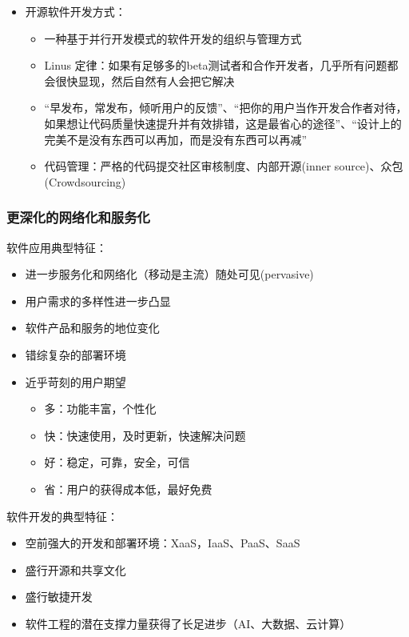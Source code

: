 \begin{itemize}
    \item 开源软件开发方式：
    \begin{itemize}
        \item 一种基于并行开发模式的软件开发的组织与管理方式
        \item Linus 定律：如果有足够多的beta测试者和合作开发者，几乎所有问题都会很快显现，然后自然有人会把它解决
        \item “早发布，常发布，倾听用户的反馈”、“把你的用户当作开发合作者对待，如果想让代码质量快速提升并有效排错，这是最省心的途径”、“设计上的完美不是没有东西可以再加，而是没有东西可以再减”
        \item 代码管理：严格的代码提交社区审核制度、内部开源(inner source)、众包(Crowdsourcing)
    \end{itemize}
\end{itemize}

\subsubsection{更深化的网络化和服务化}
软件应用典型特征：
\begin{itemize}
    \item 进一步服务化和网络化（移动是主流）随处可见(pervasive)
    \item 用户需求的多样性进一步凸显
    \item 软件产品和服务的地位变化
    \item 错综复杂的部署环境
    \item 近乎苛刻的用户期望
    \vspace{-0.8em}
    \begin{multicols}{2}
        \begin{itemize}
            \item 多：功能丰富，个性化
            \item 快：快速使用，及时更新，快速解决问题
            \item 好：稳定，可靠，安全，可信
            \item 省：用户的获得成本低，最好免费
        \end{itemize}
    \end{multicols}
    \vspace{-1em}
\end{itemize}

软件开发的典型特征：
\begin{itemize}
    \item 空前强大的开发和部署环境：XaaS，IaaS、PaaS、SaaS
    \item 盛行开源和共享文化
    \item 盛行敏捷开发
    \item 软件工程的潜在支撑力量获得了长足进步（AI、大数据、云计算）
\end{itemize}

